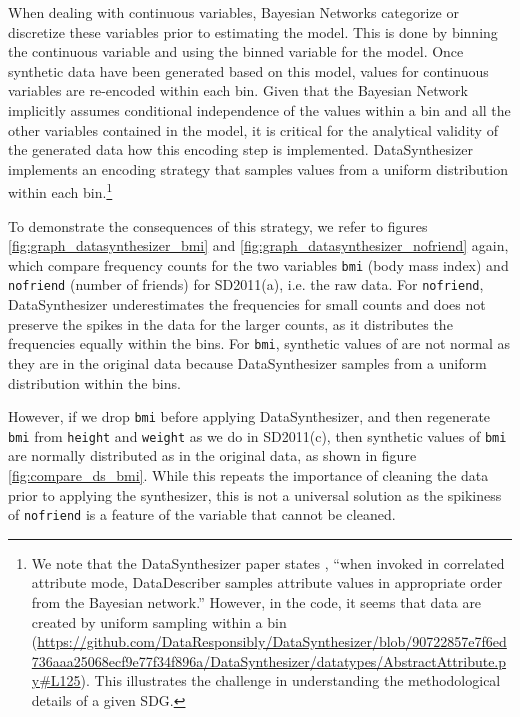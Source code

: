 \documentclass[runningheads]{llncs}
\begin{document}
When dealing with continuous variables, Bayesian Networks categorize or discretize these variables prior to estimating the model.  This is done by binning the continuous variable and using the binned variable  for the model.  Once synthetic data have been generated based on this model, values for continuous variables are re-encoded within each bin. Given that the Bayesian Network implicitly assumes conditional independence of the values within a bin and all the other variables contained in the model, it is critical for the analytical validity of the generated data how this encoding step is implemented. DataSynthesizer implements an encoding strategy that samples values from a uniform distribution  within each bin.\footnote{We note that the DataSynthesizer paper states \cite{ping2017datasynthesizer}, ``when invoked in correlated attribute mode, DataDescriber samples attribute values in appropriate order from the Bayesian network.''  However, in the code, it seems that data are created by uniform sampling within a bin (\url{https://github.com/DataResponsibly/DataSynthesizer/blob/90722857e7f6ed736aaa25068ecf9e77f34f896a/DataSynthesizer/datatypes/AbstractAttribute.py\#L125}).  This illustrates the challenge in understanding the methodological details of a given SDG.}  

To demonstrate the consequences of this strategy, we refer to figures \ref{fig:graph_datasynthesizer_bmi} and \ref{fig:graph_datasynthesizer_nofriend} again, which compare frequency counts for the two variables \texttt{bmi} (body mass index) and  \texttt{nofriend} (number of friends) for SD2011(a), i.e. the raw data.  For  \texttt{nofriend}, DataSynthesizer underestimates the frequencies for small counts and does not preserve the spikes in the data for the larger counts, as it distributes the frequencies equally within the bins. For \texttt{bmi}, synthetic values of are not normal as they are in the original data because DataSynthesizer samples from a uniform distribution within the bins.   

However, if we drop \texttt{bmi} before applying DataSynthesizer, and then regenerate \texttt{bmi} from \texttt{height} and \texttt{weight} as we do in SD2011(c), then synthetic values of \texttt{bmi} are normally distributed as in the original data, as shown in figure \ref{fig:compare_ds_bmi}.  While this repeats the importance of cleaning the data prior to applying the synthesizer, this is not a universal solution as the spikiness of \texttt{nofriend} is a feature of the variable that cannot be cleaned.
\end{document}
